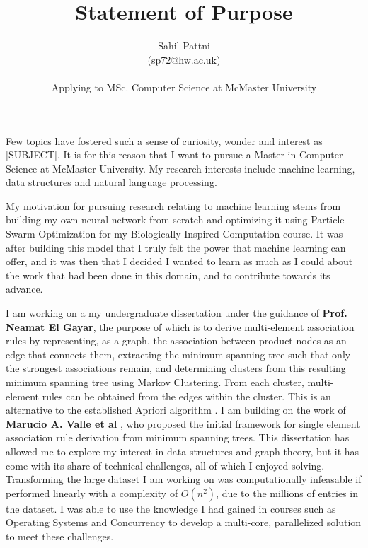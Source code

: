 \documentclass[a4paper,11pt]{article}
\newcommand{\uni}{McMaster University}
\newcommand{\program}{MSc. Computer Science }
\newcommand{\supervisor}{\textbf{Prof. Neamat El Gayar}}
\begin{document}
\title{Statement of Purpose}

\author{Sahil Pattni\\(sp72@hw.ac.uk)\\\\Applying to \program  at \uni}
\date{}
\maketitle

Few topics have fostered such a sense of curiosity, wonder and interest as [SUBJECT]. It is for this reason that I want to pursue a Master in Computer Science at \uni. My research interests include machine learning, data structures and natural language processing.

My motivation for pursuing research relating to machine learning stems from building my own neural network from scratch and optimizing it using Particle Swarm Optimization for my Biologically Inspired Computation course. It was after building this model that I truly felt the power that machine learning can offer, and it was then that I decided I wanted to learn as much as I could about the work that had been done in this domain, and to contribute towards its advance.

I am working on a my undergraduate dissertation under the guidance of \supervisor, the purpose of which is to derive multi-element association rules by representing, as a graph, the association between product nodes as an edge that connects them, extracting the minimum spanning tree such that only the strongest associations remain, and determining clusters from this resulting minimum spanning tree using Markov Clustering. From each cluster, multi-element rules can be obtained from the edges within the cluster. This is an alternative to the established Apriori algorithm \cite{apriori}. I am building on the work of \textbf{Marucio A. Valle et al} \cite{mst_paper}, who proposed the initial framework for single element association rule derivation from minimum spanning trees. This dissertation has allowed me to explore my interest in data structures and graph theory, but it has come with its share of technical challenges, all of which I enjoyed solving. Transforming the large dataset I am working on was computationally infeasable if performed linearly with a complexity of $O(n^2)$, due to the millions of entries in the dataset. I was able to use the knowledge I had gained in courses such as Operating Systems and Concurrency to develop a multi-core, parallelized solution to meet these challenges.
\end{document}
